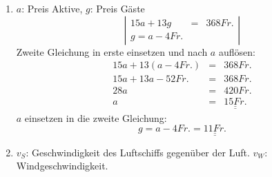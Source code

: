 \documentclass[%
11pt,%
twoside,%
titlepage,%
german,%
]{scrartcl}
\newcommand{\result}[1]{\underline{\underline{#1}}}
\begin{document}
\begin{enumerate}
\begin{enumerate}
\item $a$: Preis Aktive, $g$: Preis G\"aste
    \begin{displaymath}
      \left| 
        \begin{array}{rcl}
          15a + 13g & = & 368\unit{Fr.} \\
          g = a - 4\unit{Fr.}
        \end{array} \right|
    \end{displaymath}
    Zweite Gleichung in erste einsetzen und nach $a$ aufl\"osen:
    \begin{eqnarray*}
      15a+13(a-4\unit{Fr.}) & = & 368\unit{Fr.} \\
      15a + 13a - 52\unit{Fr.} & = & 368\unit{Fr.} \\
      28a & = & 420\unit{Fr.} \\
      a & = & \result{15\unit{Fr.}}
    \end{eqnarray*}
    $a$ einsetzen in die zweite Gleichung:
    \begin{displaymath}
      g = a-4\unit{Fr.} = \result{11\unit{Fr.}}
    \end{displaymath}

\item $v_S$: Geschwindigkeit des Luftschiffs gegen\"uber der Luft. $v_W$: Windgeschwindigkeit.


\end{enumerate}
\end{enumerate}
\end{document}
